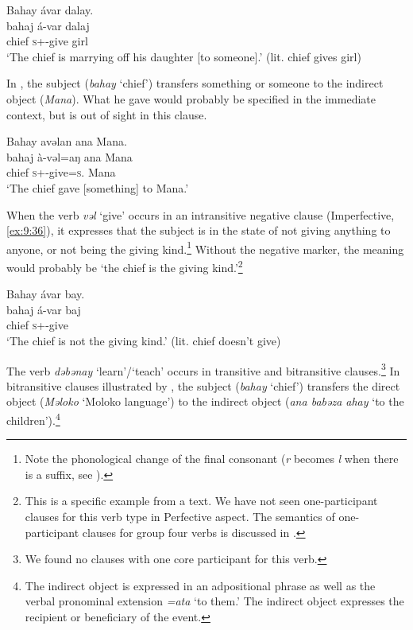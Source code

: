 \ea \label{ex:9:34}
Bahay  ávar  dalay.\\
\gll  bahaj    á-var      dalaj\\
      chief  \textsc{s}+{\IFV}-give  girl\\
\glt   ‘The chief is marrying off his daughter [to someone].’ (lit. chief gives girl) 
\z

In , the subject (\textit{bahay}  ‘chief’) transfers something or someone to the indirect object (\textit{Mana}). What he gave would probably be specified in the immediate context, but is out of sight in this clause.

\ea \label{ex:9:35}
Bahay  avəlan  ana  Mana.\\
\gll  bahaj   à-vəl=aŋ   ana   Mana\\
      chief  \textsc{s}+{\PFV}-give=\textsc{s}.{\IO}  {\DAT} Mana\\
\glt  ‘The chief gave [something] to Mana.’
\z

When the verb \textit{vəl}  ‘give’ occurs in an intransitive negative clause (Imperfective, \ref{ex:9:36}), it expresses that the subject is in the state of not giving anything to anyone, or not being the giving kind.\footnote{Note the phonological change of the final consonant (\textit{r} becomes \textit{l} when there is a suffix, see ). } Without the negative marker, the meaning would probably be ‘the chief is the giving kind.’\footnote{This is a specific example from a text. We have not seen one-participant clauses for this verb type in Perfective aspect. %
The semantics of one-participant clauses for group four verbs is discussed in .}

\ea \label{ex:9:36}
Bahay  ávar  bay.\\
\gll  bahaj  á-var       baj\\
      chief  \textsc{s}+{\IFV}-give  {\NEG}\\
\glt  ‘The chief is not the giving kind.’ (lit. chief doesn’t give) 
\z

The verb \textit{dəbənay} ‘learn’/‘teach’ occurs in transitive and bitransitive clauses.\footnote{We found no clauses with one core participant for this verb. } In bitransitive clauses illustrated by , the subject (\textit{bahay}  ‘chief’) transfers the direct object (\textit{Məloko} ‘Moloko language’) to the indirect object (\textit{ana babəza ahay} ‘to the children’).\footnote{The indirect object is expressed in an adpositional phrase as well as the verbal pronominal extension \textit{=ata} ‘to them.’ The indirect object expresses the recipient or beneficiary of the event.} 

